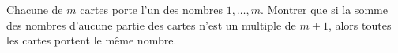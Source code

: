 Chacune de $m$ cartes porte l'un des nombres $1, \ldots, m$. Montrer que si la somme des nombres d'aucune partie des cartes n'est un multiple de $m + 1$, alors toutes les cartes portent le même nombre.
